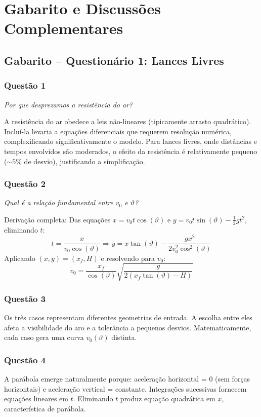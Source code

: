 \documentclass[12pt,a4paper]{article}
\begin{document}
\newpage


\section{Gabarito e Discussões Complementares}

\subsection{Gabarito -- Questionário 1: Lances Livres}

\subsubsection{Questão 1}
\textit{Por que desprezamos a resistência do ar?}

A resistência do ar obedece a leis não-lineares (tipicamente arrasto quadrático). Incluí-la levaria a equações diferenciais que requerem resolução numérica, complexificando significativamente o modelo. Para lances livres, onde distâncias e tempos envolvidos são moderados, o efeito da resistência é relativamente pequeno ($\sim 5\%$ de desvio), justificando a simplificação.

\subsubsection{Questão 2}
\textit{Qual é a relação fundamental entre $v_0$ e $\vartheta$?}

Derivação completa: Das equações $x = v_0 t \cos(\vartheta)$ e $y = v_0 t \sin(\vartheta) - \frac{1}{2}gt^2$, eliminando $t$:
$$t = \frac{x}{v_0\cos(\vartheta)} \Rightarrow y = x\tan(\vartheta) - \frac{gx^2}{2v_0^2\cos^2(\vartheta)}$$
Aplicando $(x,y) = (x_f, H)$ e resolvendo para $v_0$:
$$v_0 = \frac{x_f}{\cos(\vartheta)}\sqrt{\frac{g}{2(x_f\tan(\vartheta) - H)}}$$

\subsubsection{Questão 3}
Os três casos representam diferentes geometrias de entrada. A escolha entre eles afeta a visibilidade do aro e a tolerância a pequenos desvios. Matematicamente, cada caso gera uma curva $v_0(\vartheta)$ distinta.

\subsubsection{Questão 4}
A parábola emerge naturalmente porque: aceleração horizontal = 0 (sem forças horizontais) e aceleração vertical = constante. Integrações sucessivas fornecem equações lineares em $t$. Eliminando $t$ produz equação quadrática em $x$, característica de parábola.
\end{document}
